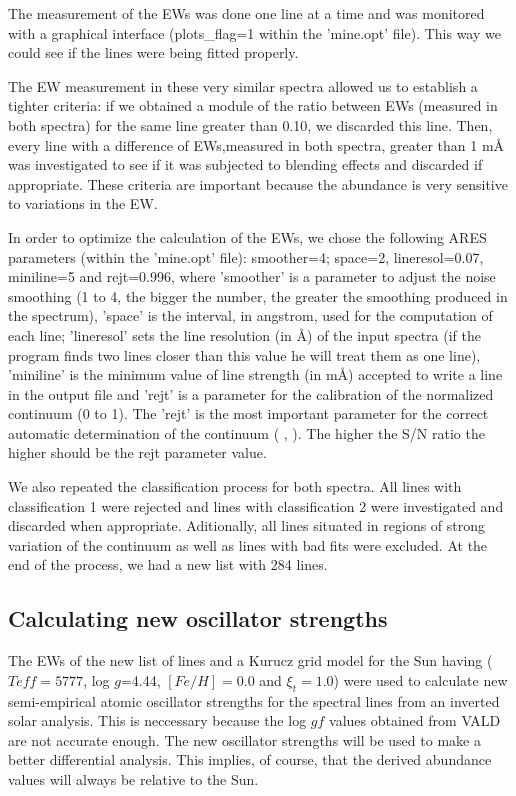 \documentclass[dvips,12pt,a4paper]{report}
\begin{document}
{The measurement of the EWs was done one line at a time and was monitored with a graphical interface (plots\_flag=1 within the 'mine.opt' file). This way we could see if the lines were being fitted properly.

The EW measurement in these very similar spectra allowed us to establish a tighter criteria: if we obtained a module of the ratio between EWs (measured in both spectra) for the same line greater than 0.10, we  discarded this line. Then, every line with a difference of EWs,measured in both spectra, greater than 1 m\AA{} was investigated to see if it was subjected to blending effects and discarded if appropriate. These criteria are important because the abundance is very sensitive to variations in the EW. %

In order to optimize the calculation of the EWs, we chose the following ARES parameters (within the 'mine.opt' file): smoother=4; space=2, lineresol=0.07, miniline=5 and rejt=0.996, where 'smoother' is a parameter to adjust the noise smoothing (1 to 4, the bigger the number, the greater the smoothing produced in the spectrum), 'space' is the interval, in angstrom, used for the computation of each line; 'lineresol' sets the line resolution (in \AA) of the input spectra (if the program finds two lines closer than this value he will treat them as one line),  'miniline' is the minimum value of line strength (in m\AA{}) accepted to write a line in the output file and 'rejt' is a parameter for the calibration of the normalized continuum (0 to 1). The 'rejt' is the most important parameter for the correct automatic determination of the continuum (\citeauthor{Sousa-2006} \citeyear{Sousa-2006}, \citeyear{Sousa-2007}). The higher the S/N ratio the higher should be the rejt parameter value.

We also repeated the classification process for both spectra. All lines with classification 1 were rejected and lines with classification 2 were investigated and discarded when appropriate. Aditionally, all lines situated in regions of strong variation of the continuum as well as lines with bad fits were excluded. At the end of the process, we had a new list with 284 lines. 

\subsection {Calculating new oscillator strengths}
\label{newloggf}
The EWs of the new list of lines and a Kurucz grid model for the Sun \citep{Kurucz-1993} having ($T{eff}=5777$, log $g$=4.44, $[Fe/H]=0.0$ and $\xi_t=1.0$) were used to calculate new semi-empirical atomic oscillator strengths for the spectral lines from an inverted solar analysis. This is neccessary because the log $gf$ values obtained from VALD are not accurate enough. The new oscillator strengths will be used to make a better differential analysis. This implies, of course, that the derived abundance values will always be relative to the Sun.

}
\end{document}
